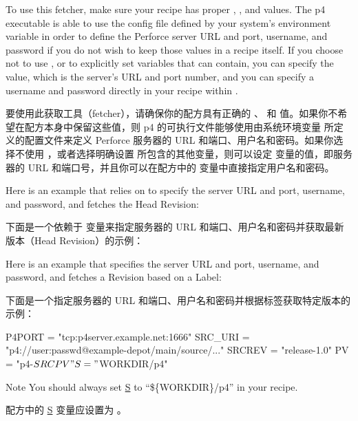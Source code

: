 To use this fetcher, make sure your recipe has proper , , and  values. The p4 executable is able to use the config file defined by your system's  environment variable in order to define the Perforce server URL and port, username, and password if you do not wish to keep those values in a recipe itself. If you choose not to use , or to explicitly set variables that  can contain, you can specify the  value, which is the server's URL and port number, and you can specify a username and password directly in your recipe within .

要使用此获取工具（fetcher），请确保你的配方具有正确的 、 和  值。如果你不希望在配方本身中保留这些值，则 p4 的可执行文件能够使用由系统环境变量  所定义的配置文件来定义 Perforce 服务器的 URL 和端口、用户名和密码。如果你选择不使用 ，或者选择明确设置  所包含的其他变量，则可以设定  变量的值，即服务器的 URL 和端口号，并且你可以在配方中的  变量中直接指定用户名和密码。

Here is an example that relies on  to specify the server URL and port, username, and password, and fetches the Head Revision:

下面是一个依赖于  变量来指定服务器的 URL 和端口、用户名和密码并获取最新版本（Head Revision）的示例：


Here is an example that specifies the server URL and port, username, and password, and fetches a Revision based on a Label:

下面是一个指定服务器的 URL 和端口、用户名和密码并根据标签获取特定版本的示例：

\begin{pyglist}
P4PORT = "tcp:p4server.example.net:1666"
SRC_URI = "p4://user:passwd@example-depot/main/source/..."
SRCREV = "release-1.0"
PV = "p4-${SRCPV}"
S = "${WORKDIR}/p4"
\end{pyglist}

\medskip
\begin{noteblock}{Note}%
You should always set \href{https://docs.yoctoproject.org/ref-manual/variables.html#term-S}{S} to ``\$\{WORKDIR\}/p4'' in your recipe.

\medskip
配方中的 \href{https://docs.yoctoproject.org/ref-manual/variables.html#term-S}{S} 变量应设置为 。
\end{noteblock}

